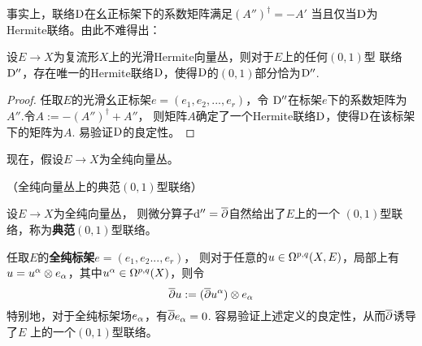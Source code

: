 
事实上，联络$\mathrm{D}$在幺正标架下的系数矩阵满足$(A'')^\dag=-A'$
当且仅当$\mathrm{D}$为Hermite联络。由此不难得出：

\begin{cor}\label{Hermite 联络的分解-cor}
设$E\to X$为复流形$X$上的光滑Hermite向量丛，则对于$E$上的任何$(0,1)$型
联络$\mathrm{D}''$，存在唯一的Hermite联络$\mathrm{D}$，使得$\mathrm{D}$的$(0,1)$部分恰为$\mathrm{D}''$.
\end{cor}


\begin{proof}
  任取$E$的光滑幺正标架$e=(e_1,e_2,...,e_r)$，令
$\mathrm{D}''$在标架$e$下的系数矩阵为$A''$.令$A:=-(A'')^\dag+A''$，
则矩阵$A$确定了一个Hermite联络$\mathrm{D}$，使得$\mathrm{D}$在该标架下的矩阵为$A$.
易验证$\mathrm{D}$的良定性。
\end{proof}

现在，假设$E\to X$为全纯向量丛。

\begin{Example}（全纯向量丛上的典范$(0,1)$型联络）

设$E\to X$为全纯向量丛，
则微分算子$\mathrm{d}''=\overline{\partial}$自然给出了$E$上的一个
$(0,1)$型联络，称为\textbf{典范$(0,1)$}型联络。
\end{Example}

任取$E$的\textbf{全纯标架}$e=(e_1,e_2...,e_r)$，
则对于任意的$u\in\Omega^{p,q}(X,E)$，局部上有
$u=u^\alpha\otimes e_\alpha$，其中$u^\alpha\in\Omega^{p,q}(X)$，则令
$$\overline{\partial} u:=(\overline{\partial} u^\alpha)\otimes e_\alpha$$
特别地，对于全纯标架场$e_\alpha$，有$\overline{\partial} e_\alpha=0$.
容易验证上述定义的良定性，从而$\overline{\partial}$诱导了$E$
上的一个$(0,1)$型联络。

